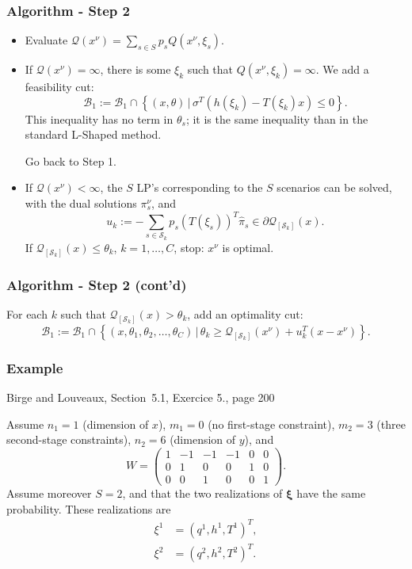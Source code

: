 \documentclass{beamer}
\def\bxi{\boldsymbol\xi}
\begin{document}
\begin{frame}
\frametitle{Algorithm - Step 2}

\begin{itemize}
\item
Evaluate $\mathcal{Q}(x^{\nu}) = \sum_{s \in S} p_s Q(x^{\nu}, \xi_s)$.
\item
If $\mathcal{Q}(x^{\nu}) = \infty$, there is some $\xi_k$ such that $Q(x^{\nu}, \xi_k) = \infty$.
We add a {\red feasibility cut}:
\[
\mathcal{B}_1 := \mathcal{B}_1 \cap \left\lbrace (x, \theta) \,|\,
\sigma^T(h(\xi_k)-T(\xi_k)x) \leq 0 \right\rbrace.
\]
This inequality has no term in $\theta_s$; it is the same inequality than in the standard L-Shaped method.

Go back to Step 1.
\item
If $\mathcal{Q}(x^{\nu}) < \infty$, the $S$ LP's corresponding to the $S$ scenarios can be solved, with the dual solutions $\pi_s^{\nu}$, and
\[
u_k := -\sum_{s \in \mathcal{S}_k} p_s(T(\xi_s))^T\hat{\pi}_s
\in \partial \mathcal{Q}_{[\mathcal{S}_k]}(x).
\]
If $\mathcal{Q}_{[\mathcal{S}_k]}(x) \leq \theta_k$, $k = 1,\ldots,C$, stop: $x^{\nu}$ is optimal.
\end{itemize}

\end{frame}

\begin{frame}
\frametitle{Algorithm - Step 2 (cont'd)}

For each $k$ such that  $\mathcal{Q}_{[\mathcal{S}_k]}(x) >
\theta_k$, add an optimality cut:
\[
\mathcal{B}_1 := \mathcal{B}_1 \cap \left\lbrace (x, \theta_1,
\theta_2,\ldots, \theta_C) \,|\, \theta_k \geq
\mathcal{Q}_{[\mathcal{S}_k]}(x^{\nu}) + u_k^T(x-x^{\nu}) \right\rbrace.
\]



\end{frame}

\begin{frame}
\frametitle{Example}

{\red Birge and Louveaux, Section~5.1, Exercice 5., page 200}

\mbox{}

Assume $n_1 = 1$ (dimension of $x$), $m_1 = 0$ (no first-stage constraint), $m_2 = 3$ (three second-stage constraints), $n_2 = 6$ (dimension of $y$), and
\[
W = \begin{pmatrix}
1 & -1 & -1 & -1 & 0 & 0 \\
0 & 1 & 0 & 0 & 1 & 0 \\
0 & 0 & 1 & 0 & 0 & 1
\end{pmatrix}.
\]
Assume moreover $S = 2$, and that the two realizations of $\bxi$ have the same probability.
These realizations are
\begin{align*}
\xi^1 &= (q^1, h^1, T^1)^T, \\
\xi^2 &= (q^2, h^2, T^2)^T.
\end{align*}

\end{frame}
\end{document}
